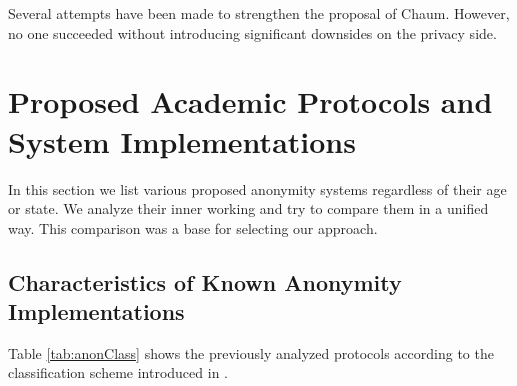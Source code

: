 Several attempts have been made to strengthen the proposal of Chaum\cite{golle:eurocrypt2004,disco,herbivore:tr,Corrigan-Gibbs:2010:DAA:1866307.1866346}. However, no one succeeded without introducing significant downsides on the privacy side.

\chapter{Proposed Academic Protocols and System Implementations\label{sec:implSystems}}
In this section we list various proposed anonymity systems regardless of their age or state. We analyze their inner working and try to compare them in a unified way. This comparison was a base for selecting our approach.


\section{Characteristics of Known Anonymity Implementations}
Table \ref{tab:anonClass} shows the previously analyzed protocols according to the classification scheme introduced in \cite{Shirazi2018}.

